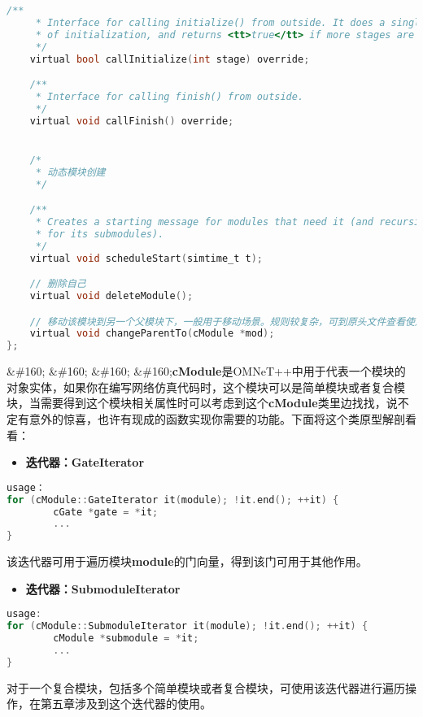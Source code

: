 \begin{lstlisting}[language=c,caption=My]
    /**
     * Interface for calling initialize() from outside. It does a single stage
     * of initialization, and returns <tt>true</tt> if more stages are required.
     */
    virtual bool callInitialize(int stage) override;

    /**
     * Interface for calling finish() from outside.
     */
    virtual void callFinish() override;


    /*
     * 动态模块创建
     */

    /**
     * Creates a starting message for modules that need it (and recursively
     * for its submodules).
     */
    virtual void scheduleStart(simtime_t t);

    // 删除自己
    virtual void deleteModule();

    // 移动该模块到另一个父模块下，一般用于移动场景。规则较复杂，可到原头文件查看使用说明
    virtual void changeParentTo(cModule *mod);
};
\end{lstlisting}

\&\#160; \&\#160; \&\#160; \&\#160;\textbf{cModule}是OMNeT++中用于代表一个模块的对象实体，如果你在编写网络仿真代码时，这个模块可以是简单模块或者复合模块，当需要得到这个模块相关属性时可以考虑到这个\textbf{cModule}类里边找找，说不定有意外的惊喜，也许有现成的函数实现你需要的功能。下面将这个类原型解剖看看：

\begin{itemize}
\item \textbf{迭代器：GateIterator}

\end{itemize}

\begin{lstlisting}[language=c]
usage：
for (cModule::GateIterator it(module); !it.end(); ++it) {
        cGate *gate = *it;
        ...
}
\end{lstlisting}

该迭代器可用于遍历模块\textbf{module}的门向量，得到该门可用于其他作用。

\begin{itemize}
\item \textbf{迭代器：SubmoduleIterator}

\end{itemize}

\begin{lstlisting}[language=c]
usage:
for (cModule::SubmoduleIterator it(module); !it.end(); ++it) {
        cModule *submodule = *it;
        ...
}
\end{lstlisting}

对于一个复合模块，包括多个简单模块或者复合模块，可使用该迭代器进行遍历操作，在第五章涉及到这个迭代器的使用。

